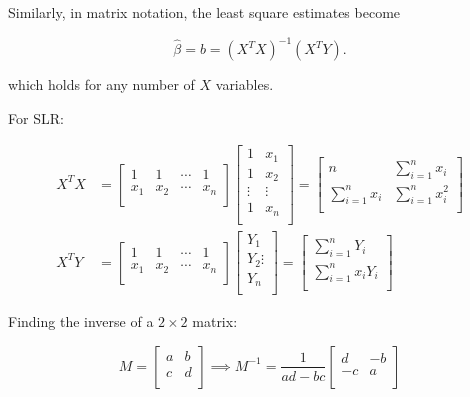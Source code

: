 \documentclass[a4paper, 11pt, twoside]{article}
\begin{document}
Similarly, in matrix notation, the least square estimates become 

\[\hat{\beta} = b = (X^TX)^{-1}(X^TY).\]

which holds for any number of $X$ variables.

For SLR:

\[
\begin{split}
	X^TX &=
\begin{bmatrix}
	1 & 1 & \cdots & 1\\
	x_1 & x_2 & \cdots & x_n\\
\end{bmatrix}
\begin{bmatrix}
	1 & x_1\\
	1 & x_2\\
	\vdots & \vdots \\
	1 & x_n\\
\end{bmatrix}
=\begin{bmatrix}
	n & \sum\limits^n_{i=1}x_i\\
	\sum\limits^n_{i=1}x_i & \sum\limits^n_{i=1}x_i^2\\
\end{bmatrix}\\
X^TY &=
\begin{bmatrix}
	1 & 1 & \cdots & 1\\
	x_1 & x_2 &\cdots & x_n\\
\end{bmatrix}
\begin{bmatrix}
	Y_1\\Y_2\vdots\\Y_n\\
\end{bmatrix}
=\begin{bmatrix}
	\sum\limits^n_{i=1}Y_i\\
	\sum\limits^n_{i=1}x_iY_i\\
\end{bmatrix}
\end{split}
\]

Finding the inverse of a $2\times 2$ matrix:

\[M=\begin{bmatrix}
	a & b\\c & d\\
\end{bmatrix}\implies
M^{-1}=\frac1{ad-bc}\begin{bmatrix}
	d & -b\\ -c & a\\
\end{bmatrix}
\]
\end{document}
